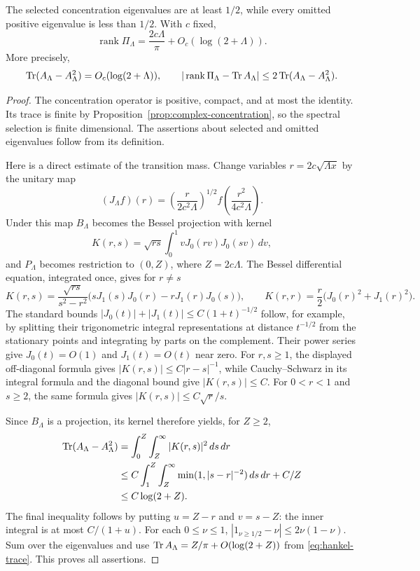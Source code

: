 \begin{proposition}
\label{prop:hankel-selection-size}
The selected concentration eigenvalues are at least $1/2$, while
every omitted positive eigenvalue is less than $1/2$. With $c$ fixed,
\[
 \operatorname{rank}\Pi_\Lambda
     =\frac{2c\Lambda}{\pi}+O_c(\log(2+\Lambda)).
\]
More precisely,
\[
 \operatorname{Tr}(A_\Lambda-A_\Lambda^2)=O_c(\log(2+\Lambda)),
 \qquad
 |\operatorname{rank}\Pi_\Lambda-\operatorname{Tr} A_\Lambda|
          \leq2\operatorname{Tr}(A_\Lambda-A_\Lambda^2).
\]
\end{proposition}
\begin{proof}
The concentration operator is positive, compact, and at most the
identity. Its trace is finite by
Proposition~\ref{prop:complex-concentration}, so the spectral
selection is finite dimensional. The assertions about selected and
omitted eigenvalues follow from its definition.

Here is a direct estimate of the transition mass. Change variables
$r=2c\sqrt{\Lambda x}$ by the unitary map
\[
 (J_\Lambda f)(r)
    =\left(\frac{r}{2c^2\Lambda}\right)^{1/2}
                        f\left(\frac{r^2}{4c^2\Lambda}\right).
\]
Under this map $B_\Lambda$ becomes the Bessel projection with kernel
\[
 K(r,s)=\sqrt{rs}\int_0^1vJ_0(rv)J_0(sv)\,dv,
\]
and $P_\Lambda$ becomes restriction to $(0,Z)$, where $Z=2c\Lambda$.
The Bessel differential equation, integrated once, gives for $r\ne s$
\[
 K(r,s)=\frac{\sqrt{rs}}{s^2-r^2}
       \bigl(sJ_1(s)J_0(r)-rJ_1(r)J_0(s)\bigr),
 \qquad
 K(r,r)=\frac r2\bigl(J_0(r)^2+J_1(r)^2\bigr).
\]
The standard bounds $|J_0(t)|+|J_1(t)|\leq C(1+t)^{-1/2}$
follow, for example, by splitting their trigonometric integral
representations at distance $t^{-1/2}$ from the stationary points
and integrating by parts on the complement. Their power series
give $J_0(t)=O(1)$ and $J_1(t)=O(t)$ near zero.
For $r,s\geq1$, the displayed off-diagonal formula gives
$|K(r,s)|\leq C|r-s|^{-1}$, while Cauchy--Schwarz in its integral
formula and the diagonal bound give $|K(r,s)|\leq C$.
For $0<r<1$ and $s\geq2$, the same formula gives
$|K(r,s)|\leq C\sqrt r/s$.

Since $B_\Lambda$ is a projection, its kernel therefore yields,
for $Z\geq2$,
\[
 \begin{split}
 \operatorname{Tr}(A_\Lambda-A_\Lambda^2)
 &=\int_0^Z\int_Z^\infty|K(r,s)|^2\,ds\,dr\\
 &\leq C\int_1^Z\int_Z^\infty
          \min(1,|s-r|^{-2})\,ds\,dr+C/Z\\
 &\leq C\log(2+Z).
 \end{split}
\]
The final inequality follows by putting $u=Z-r$ and $v=s-Z$:
the inner integral is at most $C/(1+u)$.
For each $0\leq\nu\leq1$,
$|1_{\nu\geq1/2}-\nu|\leq2\nu(1-\nu)$.
Sum over the eigenvalues and use
$\operatorname{Tr} A_\Lambda=Z/\pi+O(\log(2+Z))$ from
\eqref{eq:hankel-trace}. This proves all assertions.
\end{proof}

